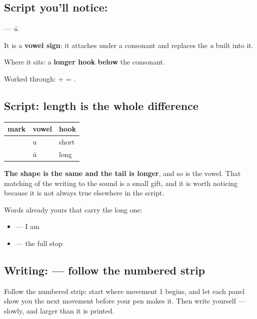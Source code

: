 \subsection*{Script you'll notice: }
\textbf{} — \emph{ū}.

It is a \textbf{vowel sign}: it attaches under a consonant and replaces the \emph{a} built into it.

Where it sits: a \textbf{longer hook below} the consonant.

Worked through: \textbf{} + \textbf{} = \textbf{}.

\subsection*{Script: length is the whole difference}
\noindent
\begin{tabularx}{\linewidth}{@{}>{\raggedright\arraybackslash}X>{\raggedright\arraybackslash}X>{\raggedright\arraybackslash}X@{}}
\toprule
\textbf{mark} & \textbf{vowel} & \textbf{hook} \\
\midrule
\hi{◌ु} & u & short \\
\hi{◌ू} & ū & long \\
\bottomrule
\end{tabularx}

\textbf{The shape is the same and the tail is longer}, and so is the vowel. That matching of the writing to the sound is a small gift, and it is worth noticing because it is not always true elsewhere in the script.

Words already yours that carry the long one:

\begin{itemize}
\raggedright
  \item \textbf{} — I am
  \item \textbf{ } — the full stop
\end{itemize}

\subsection*{Writing:  — follow the numbered strip}

Follow the numbered strip: start where movement 1 begins, and let each panel show you the next movement before your pen makes it. Then write \textbf{} yourself — slowly, and larger than it is printed.

